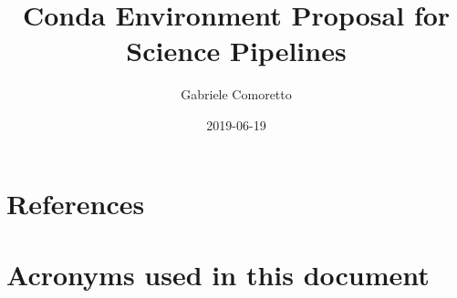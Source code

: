 \documentclass[DM,authoryear,toc]{lsstdoc}
\title{Conda Environment Proposal for Science Pipelines}
\author{%
Gabriele Comoretto
}
\date{2019-06-19}
\begin{document}
\setDocUpstreamVersion{\vcsrevision}
\maketitle




\newpage
\appendix

\section{References} \label{sec:bib}



\section{Acronyms used in this document}\label{sec:acronyms}

\end{document}
